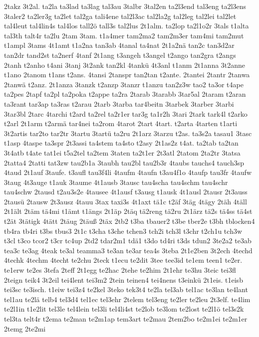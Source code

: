 {2takz
3t2al.
ta2la
ta3lad
ta3lag
tal3au
3talbr
3tal2en
ta2l3end
tal3eng
ta2l3ens
3taler2
ta2ler3g
ta2let
tal2ga
tali4ene
tal2l3ac
tal2la2g
tal2leg
tal2lei
tal2let
tal4leut
tal4lin4s
tal4los
tall2ö
tall3s
tal2lus
2t1alm.
ta2lop
ta2l1o2r
3tals
t1alta
tal3th
talt4r
ta2lu
2tam
3tam.
t1a4mer
tam2ma2
tam2m3er
tam4mi
tam2mut
t1ampl
3tams
4t1amt
t1a2na
tan3ab
4tanal
ta4nat
2t1a2nä
tan2c
tan3d2ar
tan2dr
tand2st
ta2nerf
4tanf
2t1ang
t3angeh
t3angel
t2ango
tan2gra
t2angs
2tanh
t2anho
t4ani
3tanj
3t2ank
tan2kl
4tankü
4t3anl
t1anm
2t1anna
3t2anne
t1ano
2tanom
t1ans
t2ans.
4tansi
2tanspr
tan2tan
t2ante.
2tantei
2tantr
2tanwa
2tanwä
t2anz.
2t1anza
3tanzk
t2anzp
3tanzr
t1anzu
tan2z3w
tao2
ta3or
t4ape
ta2pes
2tapf
ta2pl
ta2poka
t2appe
ta2ra
2tarab
3tarabb
3tar5al
2taram
t2aran
ta3rant
tar3ap
ta3ras
t2arau
2tarb
3tarba
tar4beitn
3tarbek
3tarber
3tarbi
3tar3bl
2tarc
4tarchi
t2ard
ta2rel
ta2r1er
tar3g
ta1r2h
3tari
2tark
tark4l
t2arko
t2arl
2t1arm
t2armä
tar4nei
ta2rom
4tarot
2tart
4tart.
t2arta
4tarten
t1arti
3t2artis
tar2to
tar2tr
3tartu
3tartü
ta2ru
2t1arz
3tarzu
t2as.
ta3s2a
tasau1
3tasc
t1asp
4taspe
ta3spr
2t3assi
ta4stem
ta4sto
t2asy
2t1as2z
t4at.
ta2tab
ta2tan
3t4atb
t4ate
tat1ei
t5a2tel
ta2tem
3taten
ta2t1er
2t3atl
2tatom
2ta2tr
3tatsa
2tatta4
2tatti
tat3zw
tau2b1a
3taubh
tau2bl
tau2b3r
4taubs
tauchs4
tauch3sp
4taud
2t1auf
3taufe.
t3aufl
tau3f4li
4taufm
4taufn
t3au4f1o
4taufp
tau3fr
4taufw
3taug
4t3auge
t1auk
3taume
4t1ausb
3tausc
tau4scha
tau4schm
tau4schr
tau4schw
2tausd
t2au3s2e
4tausee
4t1ausf
t3ausg
t1ausk
4t1ausl
2tausr
2t3auss
2tausü
2tausw
2t3ausz
4tauu
3tax
taxi3s
4t1axt
tä1c
t2äf
3täg
4tägy
2täh
4täll
2t1ält
2täm
tä4mi
t1ämt
t1ängs
2t1äp
2täq
tä2reng
tä2ru
2t1ärz
tä2s
tä4ss
tä4st
t2ät
3tätigk
4tätt
2täug
2täuß
2täx
2tb2
t3ba
tbauer2
t3be
tber2e
t3bh
tblocken4
tb4ra
tb4ri
t3bs
tbus3
2t1c
t3cha
t3che
tchen3
tch2i
tch3l
t3chr
t2ch1u
tch3w
t3cl
t3co
tcor2
t3cr
tc4up
2td2
tdar2m1
tdä1
t3do
td4ri
t3ds
tdun2
3te2a2
te3ab
tea3c
te3ag
4teak
te3al
teamma3
te3an
te3ar
tea4s
3teba
2t1e2ben
3t2ech
4techd
4techk
4techm
4techt
te2chu
2teck
t1ecu
te2dit
3tee
tee3id
te1em
teen1
te2er.
te1erw
te2es
3tefa
2teff
2t1egg
te2hac
2tehe
te2him
2t1ehr
te3hu
3teic
tei3fl
2teign
teik4
3t2eil
tei4lent
tei3m2
2tein
teinen4
tei4nens
t3einkü
2t1eis.
t1eisb
tei3sc
te3isch.
t1eiw
tei3z4
te2kel
3teko
tek3t4
te2la
tel3ab
tel1ac
te3lan
te4lant
tel1au
te2lä
telb4
tel3d4
tel1ec
tel3ehr
2telem
tel3eng
te2ler
te2leu
2t3elf.
te4lim
te2l1in
t1e2lit
tel3le
tel4lein
tel3li
tel4li4st
te2lob
te3lom
te2lost
te2l1ö
tel3s2k
tel3ta
telt4r
t2ema
te2man
te2m1ap
tem3art
te2mau
2tem2bo
te2m1ei
te2m1er
2temg
2te2mi
}
